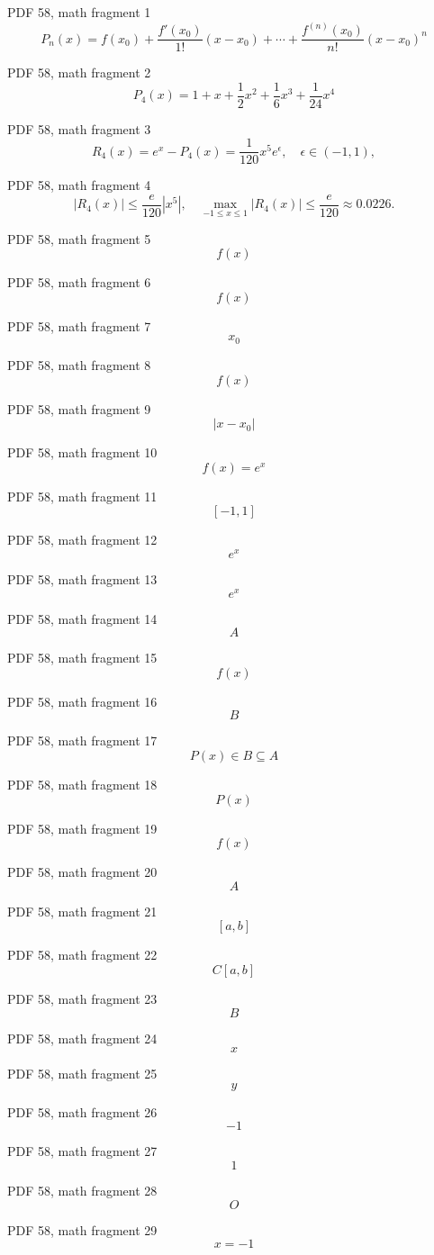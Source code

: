 \documentclass[UTF8,fontset=fandol]{ctexart}
\begin{document}
PDF 58, math fragment 1
\[
P_n(x) = f(x_0) + \frac{f'(x_0)}{1!}(x-x_0) + \cdots + \frac{f^{(n)}(x_0)}{n!}(x-x_0)^n \tag{3.1.1}
\]
\par
PDF 58, math fragment 2
\[
P_4(x) = 1+x+\frac{1}{2}x^2+\frac{1}{6}x^3+\frac{1}{24}x^4
\]
\par
PDF 58, math fragment 3
\[
R_4(x)=e^x-P_4(x)=\frac{1}{120}x^5e^\epsilon, \quad \epsilon \in(-1,1),
\]
\par
PDF 58, math fragment 4
\[
|R_4(x)| \leqslant \frac{e}{120}|x^5|, \quad \max_{-1 \leqslant x \leqslant 1}|R_4(x)| \leqslant \frac{e}{120} \approx 0.0226.
\]
\par
PDF 58, math fragment 5
\[f(x)\]
\par
PDF 58, math fragment 6
\[f(x)\]
\par
PDF 58, math fragment 7
\[x_0\]
\par
PDF 58, math fragment 8
\[f(x)\]
\par
PDF 58, math fragment 9
\[|x-x_0|\]
\par
PDF 58, math fragment 10
\[f(x)=e^x\]
\par
PDF 58, math fragment 11
\[[-1,1]\]
\par
PDF 58, math fragment 12
\[e^x\]
\par
PDF 58, math fragment 13
\[e^x\]
\par
PDF 58, math fragment 14
\[A\]
\par
PDF 58, math fragment 15
\[f(x)\]
\par
PDF 58, math fragment 16
\[B\]
\par
PDF 58, math fragment 17
\[P(x) \in B \subseteq A\]
\par
PDF 58, math fragment 18
\[P(x)\]
\par
PDF 58, math fragment 19
\[f(x)\]
\par
PDF 58, math fragment 20
\[A\]
\par
PDF 58, math fragment 21
\[[a,b]\]
\par
PDF 58, math fragment 22
\[C[a,b]\]
\par
PDF 58, math fragment 23
\[B\]
\par
PDF 58, math fragment 24
\[x\]
\par
PDF 58, math fragment 25
\[y\]
\par
PDF 58, math fragment 26
\[-1\]
\par
PDF 58, math fragment 27
\[1\]
\par
PDF 58, math fragment 28
\[O\]
\par
PDF 58, math fragment 29
\[x=-1\]
\par
\end{document}
